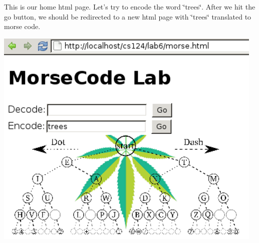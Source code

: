 This is our home html page. Let's try to encode the word \char`\"{}trees\char`\"{}. After we hit the go button, we should be redirected to a new html page with \char`\"{}trees\char`\"{} translated to morse code.

 
    \includegraphics{../test21.png}
     